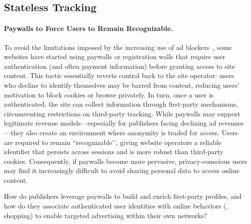 
\subsection{Stateless Tracking}

\paragraph{Paywalls to Force Users to Remain Recognizable.}
To avoid the limitations imposed by the increasing use of ad blockers~\cite{koreacopyrightcommissionNumberAdblockUsers2024}, some websites have started using paywalls or registration walls that require user authentication (and often payment information) before granting access to site content.
%
This tactic essentially reverts control back to the site operator: users who decline to identify themselves may be barred from content, reducing users' motivation to block cookies or browse privately.
%
In turn, once a user is authenticated, the site can collect information through first-party mechanisms, circumventing restrictions on third-party tracking.
%
While paywalls may support legitimate revenue models---especially for publishers facing declining ad revenues---they also create an environment where anonymity is traded for access.
%
Users are required to remain ``recognizable’’, giving website operators a reliable identifier that persists across sessions and is more robust than third-party cookies.
%
Consequently, if paywalls become more pervasive, privacy-conscious users may find it increasingly difficult to avoid sharing personal data to access online content.

\begin{opbox}
How do publishers leverage paywalls to build and enrich first-party profiles, and how do they associate authenticated user identities with online behaviors (\eg{}, shopping) to enable targeted advertising within their own networks?
\end{opbox}

